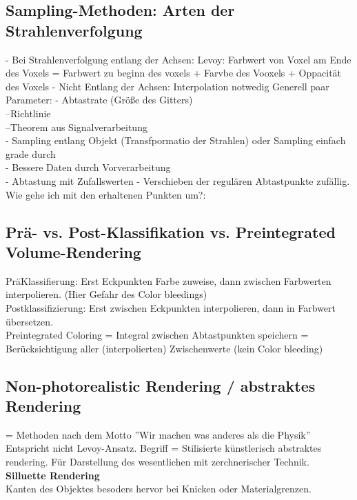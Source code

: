 \documentclass{article}
\begin{document}
\subsection{Sampling-Methoden: Arten der Strahlenverfolgung}
- Bei Strahlenverfolgung entlang der Achsen: Levoy: Farbwert von Voxel am Ende des Voxels = Farbwert zu beginn des voxels + Farvbe des Vooxels + Oppacität des Voxels
- Nicht Entlang der Achsen: Interpolation notwedig
Generell paar Parameter:
- Abtastrate  (Größe des Gitters)\\
--Richtlinie\\
--Theorem aus Signalverarbeitung\\
- Sampling entlang Objekt (Transfpormatio der Strahlen) oder Sampling einfach grade durch\\
- Bessere Daten durch Vorverarbeitung\\
- Abtastung mit Zufallswerten - Verschieben der regulären Abtastpunkte zufällig.\\

Wie gehe ich mit den erhaltenen Punkten um?:

\subsection{Prä- vs. Post-Klassifikation vs. Preintegrated Volume-Rendering}
PräKlassifierung: Erst Eckpunkten Farbe zuweise, dann zwischen Farbwerten interpolieren. (Hier Gefahr des Color bleedings)\\
Postklassifizierung: Erst zwischen Eckpunkten interpolieren, dann in Farbwert übersetzen.\\
Preintegrated Coloring = Integral zwischen Abtastpunkten speichern = Berücksichtigung aller (interpolierten) Zwischenwerte  (kein Color bleeding) \\


\subsection{Non-photorealistic Rendering / abstraktes Rendering }
= Methoden nach dem Motto ''Wir machen was anderes als die Physik'' \\
Entspricht nicht Levoy-Ansatz. Begriff = Stilisierte künstlerisch abstraktes rendering. Für Darstellung des wesentlichen mit zerchnerischer Technik.\\

\noindent \textbf{Silluette Rendering}\\
Kanten des Objektes besoders hervor bei Knicken oder Materialgrenzen.\\
\end{document}
